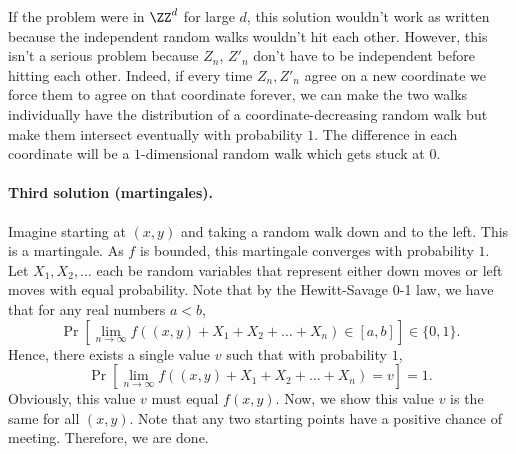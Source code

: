 \begin{remark*}
If the problem were in $\ZZ^d$ for large $d$,
this solution wouldn't work as written
because the independent random walks wouldn't hit each other.
However, this isn't a serious problem
because $Z_n$, $Z'_n$ don't have to be independent
before hitting each other.
Indeed, if every time $Z_n,Z'_n$ agree on a new coordinate
we force them to agree on that coordinate forever,
we can make the two walks individually have the distribution
of a coordinate-decreasing random walk but make them intersect
eventually with probability $1$.
The difference in each coordinate will be a $1$-dimensional
random walk which gets stuck at $0$.
\end{remark*}


\paragraph{Third solution (martingales).}
Imagine starting at $(x, y)$
and taking a random walk down and to the left.
This is a martingale.
As $f$ is bounded, this martingale converges with probability $1$.
Let $X_1, X_2, \dots$ each be random variables
that represent either down moves or left moves with equal probability.
Note that by the Hewitt-Savage 0-1 law,
we have that for any real numbers $a < b$,
\[ \Pr\left[ \lim_{n \to \infty} f((x, y)+X_1+X_2+\dots + X_n)
  \in [a, b] \right] \in \{0,1\}. \]
Hence, there exists a single value $v$ such that with probability $1$,
\[ \Pr\left[\lim_{n \to \infty} f((x, y)+X_1+X_2+\dots + X_n)
  = v\right] = 1. \]
Obviously, this value $v$ must equal $f(x, y)$.
Now, we show this value $v$ is the same for all $(x, y)$.
Note that any two starting points have a positive chance of meeting.
Therefore, we are done.

